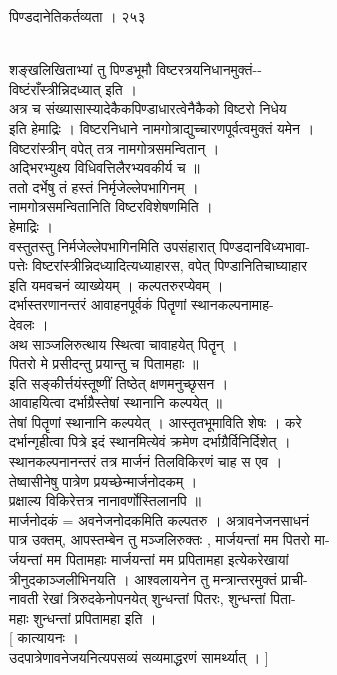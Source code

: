 \documentclass[11pt, openany]{book}
\begin{document}
{{{{{{{{{{{{{{ }{ पिण्डदानेतिकर्तव्यता । २५३}{\\
शङ्खलिखिताभ्यां तु पिण्डभूमौ विष्टरत्रयनिधानमुक्तं-\/-\\
विष्टंराँस्त्रीन्निदध्यात् इति ।\\
अत्र च संख्यासास्यादेकैकपिण्डाधारत्वेनैकैको विष्टरो निधेय\\
इति हेमाद्रिः । विष्टरनिधाने नामगोत्राद्युच्चारणपूर्वत्वमुक्तं यमेन ।\\
विष्टरांस्त्रीन् वपेत् तत्र नामगोत्रसमन्वितान् ।\\
अद्भिरभ्युक्ष्य विधिवत्तिलैरभ्यवकीर्य च ॥\\
ततो दर्भेषु तं हस्तं निर्मृजेल्लेपभागिनम् ।\\
नामगोत्रसमन्वितानिति विष्टरविशेषणमिति ।\\
हेमाद्रिः ।\\
वस्तुतस्तु निर्मजेल्लेपभागिनमिति उपसंहारात् पिण्डदानविध्यभावा-\\
पत्तेः विष्टरांस्त्रीन्निदध्यादित्यध्याहारस, वपेत् पिण्डानितिचाघ्याहार\\
इति यमवचनं व्याख्येयम् । कल्पतरुरप्येवम् ।\\
दर्भास्तरणानन्तरं आवाहनपूर्वकं पितॄणां स्थानकल्पनामाह-\\
देवलः ।\\
अथ साञ्जलिरुत्थाय स्थित्वा चावाहयेत् पितॄन् ।\\
पितरो मे प्रसीदन्तु प्रयान्तु च पितामहाः ॥\\
इति सङ्कीर्त्तयंस्तूष्णीं तिष्ठेत् क्षणमनुच्छृसन ।\\
आवाहयित्वा दर्भाग्रैस्तेषां स्थानानि कल्पयेत् ॥\\
तेषां पितॄणां स्थानानि कल्पयेत् । आस्तृतभूमाविति शेषः । करे\\
दर्भान्गृहीत्वा पित्रे इदं स्थानमित्येवं क्रमेण दर्भाग्रैर्विनिर्दिशेत्
।\\
स्थानकल्पनानन्तरं तत्र मार्जनं तिलविकिरणं चाह स एव ।\\
तेष्वासीनेषु पात्रेण प्रयच्छेन्मार्जनोदकम् ।\\
प्रक्षाल्य विकिरेत्तत्र नानावर्णोस्तिलानपि ॥\\
मार्जनोदकं = अवनेजनोदकमिति कल्पतरु । अत्रावनेजनसाधनं\\
पात्र उक्तम्, आपस्तम्बेन तु मञ्जलिरुक्तः , मार्जयन्तां मम पितरो मा-\\
र्जयन्तां मम पितामहाः मार्जयन्तां मम प्रपितामहा इत्येकरेखायां\\
त्रीनुदकाञ्जलीभिनयति । आश्वलायनेन तु मन्त्रान्तरमुक्तं प्राची-\\
नावती रेखां त्रिरुदकेनोपनयेत् शुन्धन्तां पितरः, शुन्धन्तां पिता-\\
महाः शुन्धन्तां प्रपितामहा इति ।\\
{[} कात्यायनः ।\\
उदपात्रेणावनेजयनित्यपसव्यं सव्यमाद्धरणं सामर्थ्यात् । ]

}}}}}}}}}}}}}}
\end{document}
